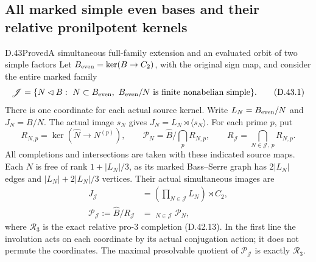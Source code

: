 \subsection{All marked simple even bases and their relative pronilpotent kernels}

\begin{statement}{D.43}{Proved}{A simultaneous full-family extension and an evaluated orbit of two simple factors}
Let $B_{\rm even}=\ker(B\to C_2)$, with the original
sign map, and consider the entire marked family
\[
 \mathscr J=\{N\lhd B:\ N\subset B_{\rm even},\
       B_{\rm even}/N\text{ is finite nonabelian simple}\}.
                                                               \tag{D.43.1}
\]
There is one coordinate for each actual source
kernel. Write $L_N=B_{\rm even}/N$ and $J_N=B/N$.
The actual image $s_N$ gives
$J_N=L_N\rtimes\langle s_N\rangle$.
For each prime $p$, put
\[
 R_{N,p}=\ker(\widehat N\to N^{(p)}),\qquad
 \mathcal P_N=\widehat B/\bigcap_pR_{N,p},\qquad
 R_{\mathscr J}=\bigcap_{N\in\mathscr J,\ p}R_{N,p}.
                                                               \tag{D.43.2}
\]
All completions and intersections are taken with
these indicated source maps. Each $N$ is free
of rank $1+|L_N|/3$, as its marked
Bass--Serre graph has $2|L_N|$ edges and
$|L_N|+2|L_N|/3$ vertices. Their actual
simultaneous images are
\[
 \begin{split}
 J_{\mathscr J}
    &=\left(\prod_{N\in\mathscr J}L_N\right)\rtimes C_2,\\
 \mathcal P_{\mathscr J}
    :=\widehat B/R_{\mathscr J}
    &=\mathop{\prod_{\mathcal R_3}}_{N\in\mathscr J}
                                      \mathcal P_N ,
 \end{split}                                                   \tag{D.43.3}
\]
where $\mathcal R_3$ is the exact relative pro-$3$
completion (D.42.13). In the first line the
involution acts on each coordinate by its actual
conjugation action; it does not permute the
coordinates. The maximal prosolvable quotient
of $\mathcal P_{\mathscr J}$ is exactly
$\mathcal R_3$.


\end{statement}
